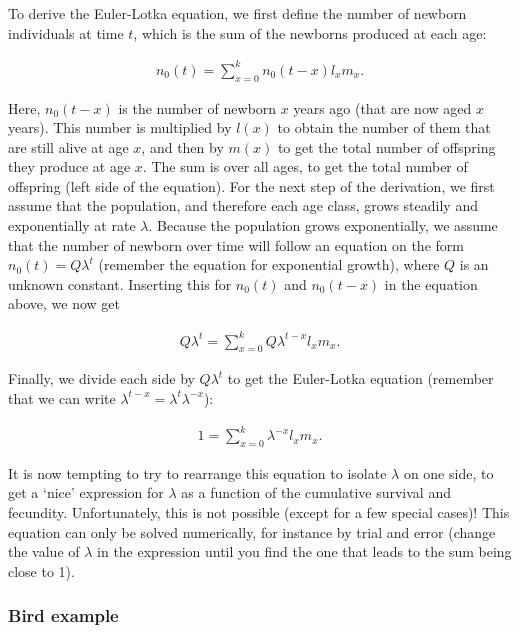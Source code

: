\documentclass[
]{book}
\begin{document}
To derive the Euler-Lotka equation, we first define the number of newborn individuals at time \(t\), which is the sum of the newborns produced at each age:

\begin{align}
n_0(t)=\sum_{x=0}^{k}n_0(t-x)l_xm_x.
\label{eq:Euler1}
\end{align}

Here, \(n_0(t-x)\) is the number of newborn \(x\) years ago (that are now aged \(x\) years). This number is multiplied by \(l(x)\) to obtain the number of them that are still alive at age \(x\), and then by \(m(x)\) to get the total number of offspring they produce at age \(x\). The sum is over all ages, to get the total number of offspring (left side of the equation). For the next step of the derivation, we first assume that the population, and therefore each age class, grows steadily and exponentially at rate \(\lambda\). Because the population grows exponentially, we assume that the number of newborn over time will follow an equation on the form \(n_0(t)=Q\lambda^t\) (remember the equation for exponential growth), where \(Q\) is an unknown constant. Inserting this for \(n_0(t)\) and \(n_0(t-x)\) in the equation above, we now get

\begin{align}
Q\lambda^{t}=\sum_{x=0}^{k}Q\lambda^{t-x}l_xm_x.
\label{eq:Euler2}
\end{align}

Finally, we divide each side by \(Q\lambda^t\) to get the Euler-Lotka equation (remember that we can write \(\lambda^{t-x}=\lambda^{t}\lambda^{-x}\)):

\begin{align}
1=\sum_{x=0}^{k}\lambda^{-x}l_xm_x.
\label{eq:Euler}
\end{align}

It is now tempting to try to rearrange this equation to isolate \(\lambda\) on one side, to get a `nice' expression for \(\lambda\) as a function of the
cumulative survival and fecundity. Unfortunately, this is not possible (except for a few special cases)! This equation can only be solved numerically, for instance by trial and error (change the value of \(\lambda\) in the expression until you find the one that leads to the sum being close to 1).

\hypertarget{bird-example-3}{%
\subsubsection*{Bird example}\label{bird-example-3}}
\end{document}
